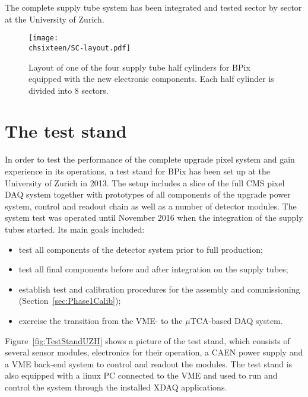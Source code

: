 The complete supply tube system has been integrated and tested sector by sector at the University of Zurich.

\begin{figure}[!htb]
 \begin{center}
 \texttt{[image: \\chsixteen/SC-layout.pdf]}
 \end{center}
 \caption{Layout of one of the four supply tube half cylinders for BPix equipped with the new electronic components. Each half cylinder is divided into 8 sectors.}
 \label{fig:phase1SC}
\end{figure}

\section{The test stand}

In order to test the performance of the complete upgrade pixel system and gain experience in its operations, a test stand for BPix has been set up at the University of Zurich in 2013.
The setup includes a slice of the full CMS pixel DAQ system together with prototypes of all components of the upgrade power system, control and readout chain as well as a number of detector modules.
The system test was operated until November 2016 when the integration of the supply tubes started.
Its main goals included:
\begin{itemize}
\item test all components of the detector system prior to full production;
\item test all final components before and after integration on the supply tubes;
\item establish test and calibration procedures for the assembly and commissioning (Section~\ref{sec:Phase1Calib});
\item exercise the transition from the VME- to the $\mu$TCA-based DAQ system.
\end{itemize}

Figure~\ref{fig:TestStandUZH} shows a picture of the test stand,
which consists of several sensor modules, electronics for their operation, a CAEN power supply and a VME back-end system to control and readout the modules.
The test stand is also equipped with a linux PC connected to the VME and used to run and control the system through the installed XDAQ applications.

